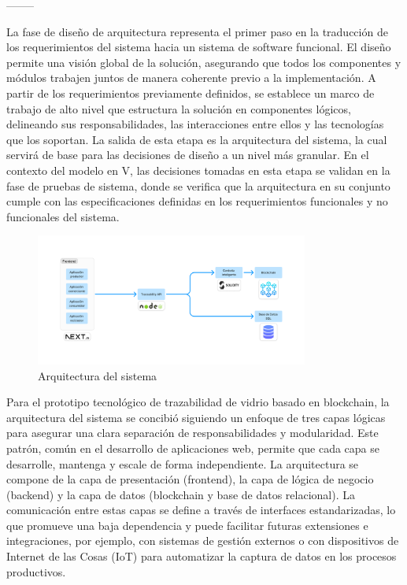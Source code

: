 --------

La fase de diseño de arquitectura representa el primer paso en la traducción de los requerimientos del sistema hacia un sistema de software funcional. El diseño permite una visión global de la solución, asegurando que todos los componentes y módulos trabajen juntos de manera coherente previo a la implementación. A partir de los requerimientos previamente definidos, se establece un marco de trabajo de alto nivel que estructura la solución en componentes lógicos, delineando sus responsabilidades, las interacciones entre ellos y las tecnologías que los soportan. La salida de esta etapa es la arquitectura del sistema, la cual servirá de base para las decisiones de diseño a un nivel más granular. En el contexto del modelo en V, las decisiones tomadas en esta etapa se validan en la fase de pruebas de sistema, donde se verifica que la arquitectura en su conjunto cumple con las especificaciones definidas en los requerimientos funcionales y no funcionales del sistema.
\begin{figure}[!htpb]
    \centering
    \includegraphics[width=0.8\textwidth]{Figures/software-architecture.png}
    \caption{Arquitectura del sistema}
    \label{fig:software-architecture}
\end{figure}

Para el prototipo tecnológico de trazabilidad de vidrio basado en blockchain, la arquitectura del sistema se concibió siguiendo un enfoque de tres capas lógicas para asegurar una clara separación de responsabilidades y modularidad. Este patrón, común en el desarrollo de aplicaciones web, permite que cada capa se desarrolle, mantenga y escale de forma independiente. La arquitectura se compone de la capa de presentación (frontend), la capa de lógica de negocio (backend) y la capa de datos (blockchain y base de datos relacional). La comunicación entre estas capas se define a través de interfaces estandarizadas, lo que promueve una baja dependencia y puede facilitar futuras extensiones e integraciones, por ejemplo, con sistemas de gestión externos o con dispositivos de Internet de las Cosas (IoT) para automatizar la captura de datos en los procesos productivos.

